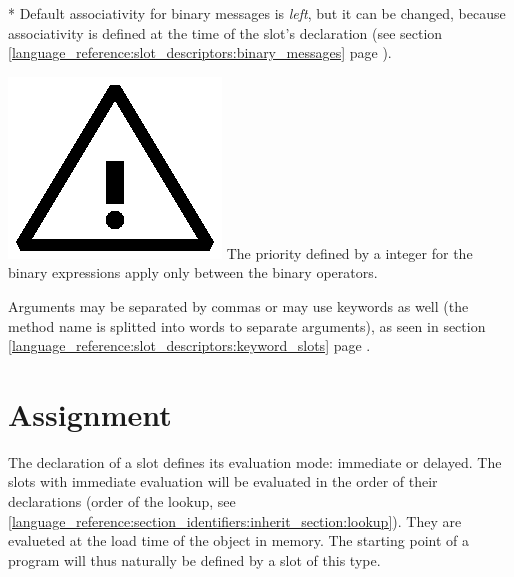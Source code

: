 \documentclass[11pt]{mybook}
\newcommand{\warning}{\includegraphics[scale=0.3]{figures/warning}}
\begin{document}
* Default associativity for binary messages is {\it{}left}, but it can be changed, because
associativity is defined at the time of the slot's declaration (see
section \ref{language_reference:slot_descriptors:binary_messages} page
\pageref{language_reference:slot_descriptors:binary_messages}). 

\warning{} The priority defined by a integer for the binary expressions apply only
between the binary operators.

Arguments may be separated by commas or may use keywords as well
(the method name is splitted into words to separate arguments), as
seen in section \ref{language_reference:slot_descriptors:keyword_slots} page \pageref{language_reference:slot_descriptors:keyword_slots}.


\section{Assignment}
\label{language_reference:slot_evaluation}
%
The declaration of a slot defines its evaluation mode: immediate or
delayed.
The slots with immediate evaluation will be evaluated in the order of
their declarations (order of the lookup, see \ref{language_reference:section_identifiers:inherit_section:lookup}).
They are evalueted at the load time of the object in memory.
The starting point of a program will thus naturally be defined by a slot of this type.
\end{document}

